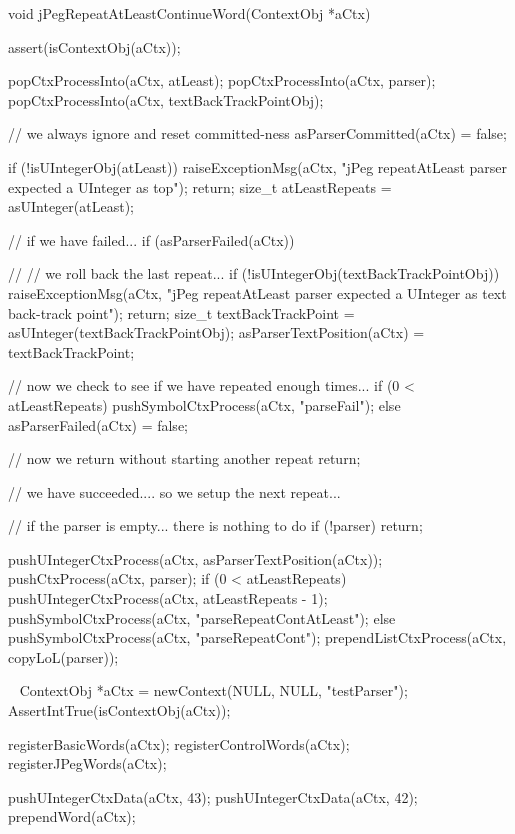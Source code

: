 \startCCode
void jPegRepeatAtLeastContinueWord(ContextObj *aCtx) {
  assert(isContextObj(aCtx));
  
  popCtxProcessInto(aCtx, atLeast);
  popCtxProcessInto(aCtx, parser);
  popCtxProcessInto(aCtx, textBackTrackPointObj);
    
  // we always ignore and reset committed-ness
  asParserCommitted(aCtx) = false;
  
  if (!isUIntegerObj(atLeast)) {
    raiseExceptionMsg(aCtx,
      "jPeg repeatAtLeast parser expected a UInteger as top");
    return;
  }
  size_t atLeastRepeats = asUInteger(atLeast);
  
  // if we have failed...
  if (asParserFailed(aCtx)) {
    //
    // we roll back the last repeat...
    if (!isUIntegerObj(textBackTrackPointObj)) {
      raiseExceptionMsg(aCtx,
        "jPeg repeatAtLeast parser expected a UInteger as text back-track point");
      return;
    }
    size_t textBackTrackPoint = asUInteger(textBackTrackPointObj);
    asParserTextPosition(aCtx) = textBackTrackPoint;
    
    // now we check to see if we have repeated enough times...
    if (0 < atLeastRepeats) {
      pushSymbolCtxProcess(aCtx, "parseFail");
    } else {
      asParserFailed(aCtx) = false;
    }
    
    // now we return without starting another repeat
    return;
  }
  
  // we have succeeded.... so we setup the next repeat...
  
  // if the parser is empty... there is nothing to do
  if (!parser) return;

  pushUIntegerCtxProcess(aCtx, asParserTextPosition(aCtx));
  pushCtxProcess(aCtx, parser);
  if (0 < atLeastRepeats) {
    pushUIntegerCtxProcess(aCtx, atLeastRepeats - 1);
    pushSymbolCtxProcess(aCtx, "parseRepeatContAtLeast");
  } else {
    pushSymbolCtxProcess(aCtx, "parseRepeatCont");
  }
  prependListCtxProcess(aCtx, copyLoL(parser));
}
\stopCCode

\CTestsSuiteSetup\
\startCTest
  ContextObj *aCtx = newContext(NULL, NULL, "testParser");
  AssertIntTrue(isContextObj(aCtx));
  
  registerBasicWords(aCtx);
  registerControlWords(aCtx);
  registerJPegWords(aCtx);
  
  pushUIntegerCtxData(aCtx, 43);
  pushUIntegerCtxData(aCtx, 42);
  prependWord(aCtx);
\stopCTest


